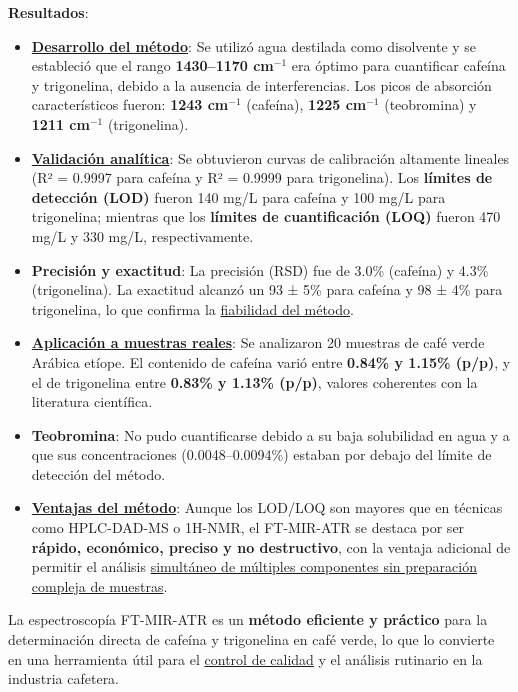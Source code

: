 \documentclass{article}
\begin{document}
\textbf{Resultados}:  
\begin{itemize}
	\item \underline{\textbf{Desarrollo del método}}: Se utilizó agua destilada como disolvente y se estableció que el rango \textbf{1430–1170 cm$^{-1}$} era óptimo para cuantificar cafeína y trigonelina, debido a la ausencia de interferencias. Los picos de absorción característicos fueron: \textbf{1243 cm$^{-1}$} (cafeína), \textbf{1225 cm$^{-1}$} (teobromina) y \textbf{1211 cm$^{-1}$} (trigonelina).  
	\item \underline{\textbf{Validación analítica}}: Se obtuvieron curvas de calibración altamente lineales (R² = 0.9997 para cafeína y R² = 0.9999 para trigonelina). Los \textbf{límites de detección (LOD)} fueron 140 mg/L para cafeína y 100 mg/L para trigonelina; mientras que los \textbf{límites de cuantificación (LOQ)} fueron 470 mg/L y 330 mg/L, respectivamente.  
	\item \textbf{Precisión y exactitud}: La precisión (RSD) fue de 3.0\% (cafeína) y 4.3\% (trigonelina). La exactitud alcanzó un 93 ± 5\% para cafeína y 98 ± 4\% para trigonelina, lo que confirma la \underline{fiabilidad del método}.  
	\item \underline{\textbf{Aplicación a muestras reales}}: Se analizaron 20 muestras de café verde Arábica etíope. El contenido de cafeína varió entre \textbf{0.84\% y 1.15\% (p/p)}, y el de trigonelina entre \textbf{0.83\% y 1.13\% (p/p)}, valores coherentes con la literatura científica.  
	\item \textbf{Teobromina}: No pudo cuantificarse debido a su baja solubilidad en agua y a que sus concentraciones (0.0048–0.0094\%) estaban por debajo del límite de detección del método.  
	\item \underline{\textbf{Ventajas del método}}: Aunque los LOD/LOQ son mayores que en técnicas como HPLC-DAD-MS o 1H-NMR, el FT-MIR-ATR se destaca por ser \textbf{rápido, económico, preciso y no destructivo}, con la ventaja adicional de permitir el análisis \underline{simultáneo de múltiples componentes sin preparación compleja de muestras}.  
\end{itemize} \vspace{0.5cm}

La espectroscopía FT-MIR-ATR es un \textbf{método eficiente y práctico} para la determinación directa de cafeína y trigonelina en café verde, lo que lo convierte en una herramienta útil para el \underline{control de calidad} y el análisis rutinario en la industria cafetera. \vspace{0.5cm}
\end{document}
